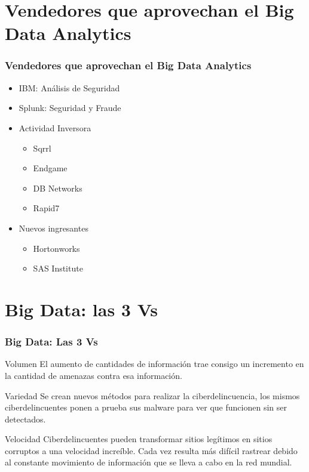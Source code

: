 \documentclass{beamer}
\begin{document}
\section{Vendedores que aprovechan el Big Data Analytics}

\begin{frame}
\frametitle{Vendedores que aprovechan el Big Data Analytics}
\begin{itemize}
\item IBM: Análisis de Seguridad
\item Splunk: Seguridad y Fraude
\item Actividad Inversora 
  \begin{itemize}
  \item Sqrrl
  \item Endgame
  \item DB Networks
  \item Rapid7
  \end{itemize}
\item Nuevos ingresantes
  \begin{itemize}
  \item Hortonworks
  \item SAS Institute
  \end{itemize}
\end{itemize}
\end{frame}

\section{Big Data: las 3 Vs}

\begin{frame}
\frametitle{Big Data: Las 3 Vs}
\begin{block}{Volumen}
El aumento de cantidades de información trae consigo un incremento en la cantidad de amenazas contra esa información.
\end{block}

\begin{block}{Variedad}
Se crean nuevos métodos para realizar la ciberdelincuencia, los mismos ciberdelincuentes ponen a prueba sus malware para ver que funcionen sin ser detectados.
\end{block}

\begin{block}{Velocidad}
Ciberdelincuentes pueden transformar sitios legítimos en sitios corruptos a una velocidad increíble. Cada vez resulta más difícil rastrear debido al constante movimiento de información que se lleva a cabo en la red mundial.
\end{block}
\end{frame}
\end{document}
